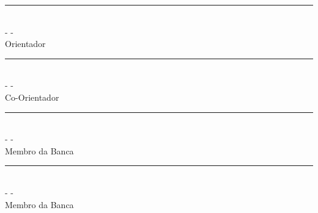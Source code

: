 \begin{folhadeaprovacao}
\begin{center}
				\vspace*{1 cm}%
				\rule{9 cm}{.1 mm}\\
				{\imprimirtitulacaoorientador}{ }{\imprimirorientador} - {\imprimirinstOrientador} - {\imprimirdepartamentoorientador}\\
				
				Orientador\\
				
				\vspace*{1 cm}%
				\rule{9 cm}{.1 mm}\\
				{\imprimirtitulacaocoorientador}{ }{\imprimircoorientador} - {\imprimirinstCoorientador} - {\imprimirdepartamentocoorientador}\\
				
				Co-Orientador\\
			
				\vspace*{1 cm}%
				\rule{9 cm}{.1 mm}\\
				\imprimirtitulacaoexamum{ }\imprimirnmexamum - \imprimirinstexamum - \imprimirdepartamentoexamum\\
				Membro da Banca
				
				\vspace*{1 cm}%
				\rule{9 cm}{.1 mm}\\				
								
				\imprimirtitulacaoexamdois{ }\imprimirnomeexamdois - \imprimirinstexamdois - \imprimirdepartamentoexamdois\\
				Membro da Banca
				\vspace*{1.3 cm}%
		    \end{center}%


\end{folhadeaprovacao}
\makeatother
